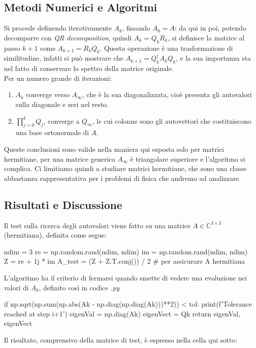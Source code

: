 \subsection{Metodi Numerici e Algoritmi}
Si procede definendo iterativamente $A_k$, fissando $A_0 = A$: da qui in poi, potendo decomporre con \textit{QR decomposition}, quindi $A_k = Q_kR_k$, si definisce la matrice al passo $k+1$ come $A_{k+1}=R_kQ_k$. Questa operazione è una trasformazione di similitudine, infatti si può mostrare che $A_{k+1}=Q^\dagger_k A_k Q_k$, e la sua importanza sta nel fatto di conservare lo spettro della matrice originale.\\
Per un numero grande di iterazioni:
\begin{enumerate}
    \item $A_k$ converge verso $A_\infty$, che è la sua diagonalizzata, cioè presenta gli autovalori sulla diagonale e zeri nel resto.
    \item $\prod_{j=0}^k Q_j$, converge a $Q_\infty$, le cui colonne sono gli autovettori che costituiscono una base ortonormale di $A$.
\end{enumerate}
Queste conclusioni sono valide nella maniera qui esposta solo per matrici hermitiane, per una matrice generica $A_\infty$ è triangolare superiore e l'algoritmo si complica. Ci limitiamo quindi a studiare matrici hermitiane, che sono una classe abbastanza rappresentativa per i problemi di fisica che andremo ad analizzare.

\subsection{Risultati e Discussione}
Il test sulla ricerca degli autovalori viene fatto su una matrice $A \in \mathbb{C}^{3 \times 3}$ (hermitiana), definita come segue:
\begin{elegantcode}
ndim = 3
re = np.random.rand(ndim, ndim)
im = np.random.rand(ndim, ndim)
Z = re + 1j * im
A_test = (Z + Z.T.conj()) / 2       # per assicurare A hermitiana
\end{elegantcode}
\noindent L'algoritmo ha il criterio di fermarsi quando smette di vedere una evoluzione nei valori di $A_k$, definito così in codice \textit{.py}

\begin{elegantcode}
if np.sqrt(np.sum(np.abs(Ak - np.diag(np.diag(Ak)))**2)) < tol:
    print(f'Tolerance reached at step {i+1}')
    eigenVal = np.diag(Ak)
    eigenVect = Qk
    return eigenVal, eigenVect
\end{elegantcode}
Il risultato, comprensivo della matrice di test, è espresso nella cella qui sotto:

